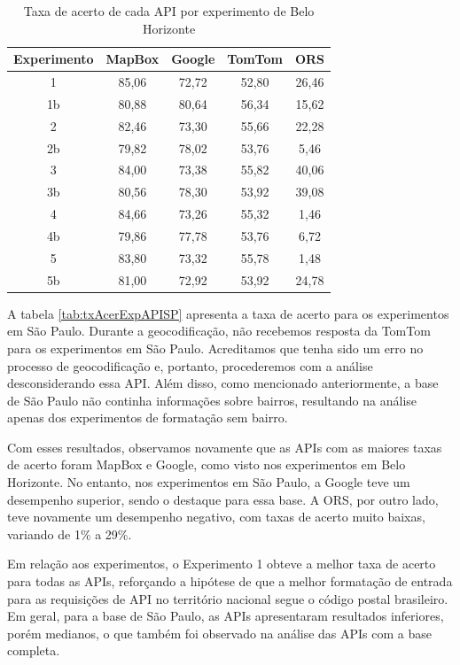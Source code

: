 \begin{table}[!ht]
\centering
\caption{Taxa de acerto de cada API por experimento de Belo Horizonte}
\label{tab:txAcerExpAPIBH}
\begin{adjustbox}{width=0.7\textwidth}
\begin{tabular}{|c|c|c|c|c|}
\hline
Experimento & MapBox & Google & TomTom & ORS\\
\hline
1 & 85,06 & 72,72 & 52,80 & 26,46\\
\hline
1b & 80,88 & 80,64 & 56,34 & 15,62\\
\hline
2 & 82,46 & 73,30 & 55,66 & 22,28\\
\hline
2b & 79,82 & 78,02 & 53,76 & 5,46\\
\hline
3 & 84,00 & 73,38 & 55,82 & 40,06\\
\hline
3b & 80,56 & 78,30 & 53,92 & 39,08\\
\hline
4 & 84,66 & 73,26 & 55,32 & 1,46\\
\hline
4b & 79,86 & 77,78 & 53,76 & 6,72\\
\hline
5 & 83,80 & 73,32 & 55,78 & 1,48\\
\hline
5b & 81,00 & 72,92 & 53,92 & 24,78\\
\hline
\end{tabular}
\end{adjustbox}
\end{table}

A tabela \ref{tab:txAcerExpAPISP} apresenta a taxa de acerto para os experimentos em São Paulo. Durante a geocodificação, não recebemos resposta da TomTom para os experimentos em São Paulo. Acreditamos que tenha sido um erro no processo de geocodificação e, portanto, procederemos com a análise desconsiderando essa API. Além disso, como mencionado anteriormente, a base de São Paulo não continha informações sobre bairros, resultando na análise apenas dos experimentos de formatação sem bairro.

Com esses resultados, observamos novamente que as APIs com as maiores taxas de acerto foram MapBox e Google, como visto nos experimentos em Belo Horizonte. No entanto, nos experimentos em São Paulo, a Google teve um desempenho superior, sendo o destaque para essa base. A ORS, por outro lado, teve novamente um desempenho negativo, com taxas de acerto muito baixas, variando de 1\% a 29\%.

Em relação aos experimentos, o Experimento 1 obteve a melhor taxa de acerto para todas as APIs, reforçando a hipótese de que a melhor formatação de entrada para as requisições de API no território nacional segue o código postal brasileiro. Em geral, para a base de São Paulo, as APIs apresentaram resultados inferiores, porém medianos, o que também foi observado na análise das APIs com a base completa.


